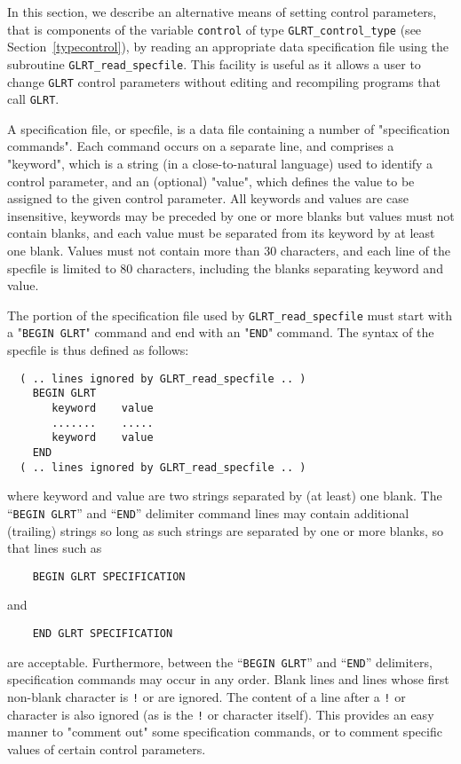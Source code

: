 \documentclass{galahad}
\newcommand{\packagename}{GL\-RT}
\begin{document}

\galfeatures
\noindent In this section, we describe an alternative means of setting
control parameters, that is components of the variable {\tt control} of type
{\tt \packagename\_control\_type}
(see Section~\ref{typecontrol}),
by reading an appropriate data specification file using the
subroutine {\tt \packagename\_read\_specfile}. This facility
is useful as it allows a user to change  {\tt \packagename} control parameters
without editing and recompiling programs that call {\tt \packagename}.

A specification file, or specfile, is a data file containing a number of
"specification commands". Each command occurs on a separate line,
and comprises a "keyword",
which is a string (in a close-to-natural language) used to identify a
control parameter, and
an (optional) "value", which defines the value to be assigned to the given
control parameter. All keywords and values are case insensitive,
keywords may be preceded by one or more blanks but
values must not contain blanks, and
each value must be separated from its keyword by at least one blank.
Values must not contain more than 30 characters, and
each line of the specfile is limited to 80 characters,
including the blanks separating keyword and value.

The portion of the specification file used by
{\tt \packagename\_read\_specfile}
must start
with a "{\tt BEGIN \packagename}" command and end with an
"{\tt END}" command.  The syntax of the specfile is thus defined as follows:
\begin{verbatim}
  ( .. lines ignored by GLRT_read_specfile .. )
    BEGIN GLRT
       keyword    value
       .......    .....
       keyword    value
    END
  ( .. lines ignored by GLRT_read_specfile .. )
\end{verbatim}
where keyword and value are two strings separated by (at least) one blank.
The ``{\tt BEGIN \packagename}'' and ``{\tt END}'' delimiter command lines
may contain additional (trailing) strings so long as such strings are
separated by one or more blanks, so that lines such as
\begin{verbatim}
    BEGIN GLRT SPECIFICATION
\end{verbatim}
and
\begin{verbatim}
    END GLRT SPECIFICATION
\end{verbatim}
are acceptable. Furthermore,
between the
``{\tt BEGIN \packagename}'' and ``{\tt END}'' delimiters,
specification commands may occur in any order.  Blank lines and
lines whose first non-blank character is {\tt !} or {\tt *} are ignored.
The content
of a line after a {\tt !} or {\tt *} character is also
ignored (as is the {\tt !} or {\tt *}
character itself). This provides an easy manner to "comment out" some
specification commands, or to comment specific values
of certain control parameters.
\end{document}
